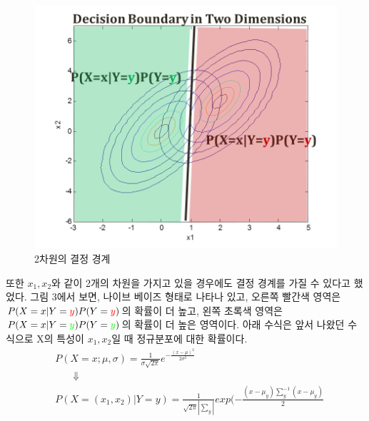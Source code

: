\documentclass[a4paper]{oblivoir}
\begin{document}
\begin{figure}[ht]\centering
\includegraphics[scale=0.5]{Decision_Boundary3}\caption{2차원의 결정 경계}\label{Fig:5-3}
\end{figure}
\indent 또한 $x_1,x_2$와 같이 2개의 차원을 가지고 있을 경우에도 결정 경계를 가질 수 있다고 했었다. 그림 3에서 보면, 나이브 베이즈 형태로 나타나 있고, 오른쪽 빨간색 영역은 $P(X=x|Y=\textcolor{red}{y})P(Y=\textcolor{red}{y})$의 확률이 더 높고, 왼쪽 초록색 영역은 $P(X=x|Y=\textcolor{green}{y})P(Y=\textcolor{green}{y})$의 확률이 더 높은 영역이다. 아래 수식은 앞서 나왔던 수식으로 X의 특성이 $x_1,x_2$일 때 정규분포에 대한 확률이다.
\begin{equation}
\begin{split}
&P(X=x;\mu ,\sigma)=\frac{1}{\sigma\sqrt{2\pi}}e^{-\frac{(x-\mu)^2}{2\sigma^2}}\\
&\ \ \ \ \ \ \ \ \Downarrow\\
&P(X=(x_1,x_2)|Y=y)=\frac{1}{\sqrt{2\pi}| \sum_y |}exp(-\frac{(x-\mu_y)\sum_{y}^{-1}(x-\mu_y)}{2}
\end{split}
\end{equation}
\\
\end{document}
